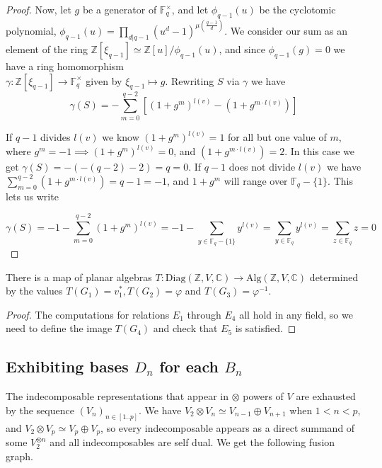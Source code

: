 \documentclass[11pt]{article} %
\begin{document}
\begin{prop}
\begin{proof}
Now, let $g$ be a generator of $\mathbb{F}_q^{\times}$, and let $\phi_{q-1}(u)$ be the cyclotomic polynomial, $\phi_{q-1}(u) = \prod_{d|q-1}{(u^d-1)^{\mu(\frac{q-1}{d})}}$. We consider our sum as an element of the ring $\mathbb{Z}[\xi_{q-1}] \simeq \mathbb{Z}[u]/ \phi_{q-1}(u)$, and since $\phi_{q-1}(g)=0$ we have a ring homomorphism \\ $\gamma: \mathbb{Z}[\xi_{q-1}] \rightarrow \mathbb{F}_q^{\times}$ given by $\xi_{q-1} \mapsto g$. Rewriting $S$ via $\gamma$ we have
$$
\gamma(S) = - \sum_{m=0}^{q-2}[(1+g^m)^{l(v)}-(1 + g^{m \cdot l(v)})]
$$

If $q-1$ divides $l(v)$ we know $(1 + g^m)^{l(v)} = 1$ for all but one value of $m$, where $g^m=-1 \implies (1+g^m)^{l(v)}=0$, and $(1+g^{m\cdot l(v)}) = 2$. In this case we get $\gamma(S) = - (-(q-2)-2) = q = 0$.  If $q-1$ does not divide $l(v)$ we have $\sum_{m=0}^{q-2}(1+g^{m\cdot l(v)}) = q-1 = -1$, and $1 + g^m$ will range over $\mathbb{F}_q - \{1\}$. This lets us write

$$
\gamma(S) = -1-\sum_{m=0}^{q-2}(1+g^m)^{l(v)}=-1-\sum_{y \in \mathbb{F}_q-\{1\}}{y^{l(v)}} = \sum_{y \in \mathbb{F}_q}{y^{l(v)}}=\sum_{z \in \mathbb{F}_q}{z} = 0 
$$ 

\end{proof}
\end{prop}




\begin{prop} There is a map of planar algebras $T:\text{Diag}{(\mathbb{Z},V,\mathbb{C})} \rightarrow \text{Alg}{(\mathbb{Z},V,\mathbb{C})}$ determined by the values $T(G_1)=v_1^{\ast},T(G_2)=\varphi$ and $T(G_3)=\varphi^{-1}$.
\end{prop}
\begin{proof} The computations for relations $E_1$ through $E_4$ all hold in any field, so we need to define the image $T(G_4)$ and check that $E_5$ is satisfied.
\end{proof}

\subsection{Exhibiting bases $D_n$ for each $B_n$}

The indecomposable representations that appear in $\otimes$ powers of $V$ are exhausted by the sequence $(V_n)_{n \in [1..p]}$. We have $V_2 \otimes V_n \simeq V_{n-1} \oplus V_{n+1}$ when $1 < n < p$, and $V_2 \otimes V_p \simeq V_p \oplus V_p$, so every indecomposable appears as a direct summand of some $V_2^{\otimes n}$ and all indecomposables are self dual. We get the following fusion graph.
\end{document}
